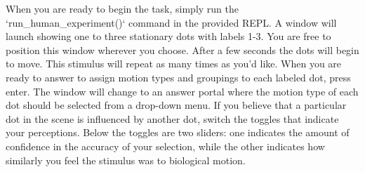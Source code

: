 \documentclass{scrartcl}
\begin{document}
When you are ready to begin the task, simply run the `run_human_experiment()` command in the provided REPL. A window will launch showing one to three stationary dots with labels 1-3. You are free to position this window wherever you choose. After a few seconds the dots will begin to move. This stimulus will repeat as many times as you'd like. When you are ready to answer to assign motion types and groupings to each labeled dot, press enter. The window will change to an answer portal where the motion type of each dot should be selected from a drop-down menu. If you believe that a particular dot in the scene is influenced by another dot, switch the toggles that indicate your perceptions. Below the toggles are two sliders: one indicates the amount of confidence in the accuracy of your selection, while the other indicates how similarly you feel the stimulus was to biological motion. 
  
\end{document}
